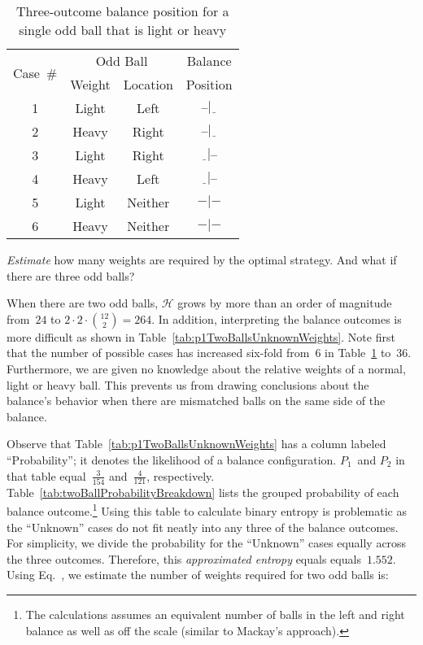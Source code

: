   \begin{table}[H]
    \centering
    \caption{Three-outcome balance position for a \\single odd ball that is light or heavy}\label{tab:p1OneBallTable}
    \begin{tabular}{|c||c|c||c|}
      \hline
      \multirow{2}{*}{Case~\#} &  \multicolumn{2}{c||}{Odd Ball} & Balance\\\cline{2-3}
      &  Weight  &  Location &  Position  \\ \hline\hline
      1   &  Light   &  Left     &  $\bar{~}\bar{~}|\underline{~~}$ \\ \hline
      2   &  Heavy   &  Right    &  $\bar{~}\bar{~}|\underline{~~}$ \\ \hline\hline
      3   &  Light   &  Right    &  $\underline{~~}|\bar{~}\bar{~}$ \\ \hline
      4   &  Heavy   &  Left     &  $\underline{~~}|\bar{~}\bar{~}$ \\ \hline\hline
      5   &  Light   &  Neither  &  $-|-$ \\ \hline
      6   &  Heavy   &  Neither  &  $-|-$ \\ \hline
    \end{tabular}
  \end{table}


\begin{subproblem}
  \textit{Estimate} how many weights are required by the optimal strategy.  And what if there are three odd balls?
\end{subproblem}

  When there are two odd balls, $\mathcal{H}$ grows by more than an order of magnitude from~$24$ to ${2\cdot2\cdot\binom{12}{2} = 264}$. In addition, interpreting the balance outcomes is more difficult as shown in Table~\ref{tab:p1TwoBallsUnknownWeights}.  Note first that the number of possible cases has increased six-fold from~6 in Table~\ref{tab:p1OneBallTable} to~36.  Furthermore, we are given no knowledge about the relative weights of a normal, light or heavy ball.  This prevents us from drawing conclusions about the balance's behavior when there are mismatched balls on the same side of the balance.

  

  Observe that Table~\ref{tab:p1TwoBallsUnknownWeights} has a column labeled ``Probability''; it denotes the likelihood of a balance configuration.  $P_{1}$~and $P_{2}$ in that table equal~$\frac{3}{154}$ and~$\frac{4}{121}$, respectively.  Table~\ref{tab:twoBallProbabilityBreakdown} lists the grouped probability of each balance outcome.\footnote{The calculations assumes an equivalent number of balls in the left and right balance as well as off the scale (similar to Mackay's approach).}  Using this table to calculate binary entropy is problematic as the ``Unknown'' cases do not fit neatly into any three of the balance outcomes.  For simplicity, we divide the probability for the ``Unknown'' cases equally across the three outcomes.  Therefore, this \textit{approximated entropy} equals equals~$1.552$.   Using Eq.~, we estimate the number of weights required for two odd balls is:

